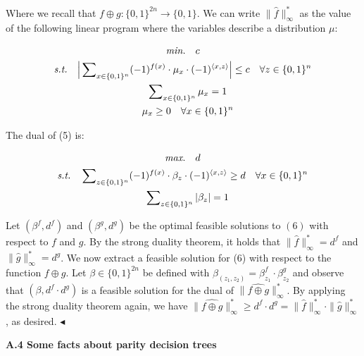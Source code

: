 \documentclass[10pt,a4paper]{article}
\begin{document}
Where we recall that $f\oplus g:\{0,1\}^{2n}\to\{0,1\}$. We can write $\|\widehat{f}\|_{\infty}^{*}$ as the value of the following linear program where the variables describe a distribution $\mu$:\par


\[\begin{gathered}
\emph{min.} \displaystyle\quad c \\
\emph{s.t.} \displaystyle\quad\Big{|}\sum\nolimits_{x\in\{0,1\}^{n}}(-1)^{f(x)}\cdot\mu_{x}\cdot(-1)^{\langle x,z\rangle}\Big{|}\leq c \displaystyle\quad\forall z\in\{0,1\}^{n} \\
\displaystyle\quad\sum\nolimits_{x\in\{0,1\}^{n}}\mu_{x}=1 \\
\displaystyle\quad\mu_{x}\geq 0 \displaystyle\quad\forall x\in\{0,1\}^{n}
\end{gathered}\]


The dual of (5) is:\par


\[\begin{gathered}
\emph{max.} \displaystyle\quad d \\
\emph{s.t.} \displaystyle\quad\sum\nolimits_{z\in\{0,1\}^{n}}(-1)^{f(x)}\cdot\beta_{z}\cdot(-1)^{\langle x,z\rangle}\geq d\quad\forall x\in\{0,1\}^{n} \\
\displaystyle\quad\sum\nolimits_{z\in\{0,1\}^{n}}|\beta_{z}|=1
\end{gathered}\]


Let $(\beta^{f},d^{f})$ and $(\beta^{g},d^{g})$ be the optimal feasible solutions to $(6)$ with respect to $f$ and $g$. By the strong duality theorem, it holds that $\|\widehat{f}\|_{\infty}^{*}=d^{f}$ and $\|\widehat{g}\|_{\infty}^{*}=d^{g}$. We now extract a feasible solution for (6) with respect to the function $f\oplus g$. Let $\beta\in\{0,1\}^{2n}$ be defined with $\beta_{(z_{1},z_{2})}=\beta^{f}_{z_{1}}\cdot\beta^{g}_{z_{2}}$ and observe that $(\beta,d^{f}\cdot d^{g})$ is a feasible solution for the dual of $\|\widehat{f\oplus g}\|_{\infty}^{*}$. By applying the strong duality theorem again, we have $\|\widehat{f\oplus g}\|_{\infty}^{*}\geq d^{f}\cdot d^{g}=\|\widehat{f}\|_{\infty}^{*}\cdot\|\widehat{g}\|_{\infty}^{*}$, as desired.
$\blacktriangleleft$\par






\par\medskip\noindent\textbf{
A.4 Some facts about parity decision trees}\par
\end{document}
